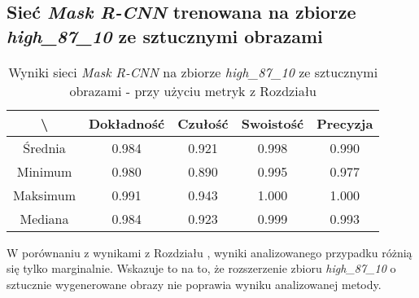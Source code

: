 \subsection{Sieć \textit{Mask R-CNN} trenowana na zbiorze \textit{high\_87\_10} ze sztucznymi obrazami}
\label{sec:results_high_original_generated}

\begin{table}[H]
	\centering
	\caption{Wyniki sieci \textit{Mask R-CNN} na zbiorze \textit{high\_87\_10} ze sztucznymi obrazami - przy użyciu metryk z Rozdziału }
	\vspace{6pt}
	{\footnotesize
		\begin{tabular}{|c|c|c|c|c|}
      \hline \textbackslash & Dokładność & Czułość & Swoistość & Precyzja \\
      \hline Średnia & 0.984 & 0.921 & 0.998 & 0.990 \\
      \hline Minimum & 0.980 & 0.890 & 0.995 & 0.977 \\
      \hline Maksimum & 0.991 & 0.943 & 1.000 & 1.000 \\
      \hline Mediana & 0.984 & 0.923 & 0.999 & 0.993 \\
      \hline
		\end{tabular}
	}
  \vspace{0pt}
  \label{Tab:high_original_generated_calculated}
\end{table}

W porównaniu z wynikami z Rozdziału , wyniki analizowanego przypadku różnią się tylko marginalnie. Wskazuje to na to, że rozszerzenie zbioru \textit{high\_87\_10} o sztucznie wygenerowane obrazy nie poprawia wyniku analizowanej metody.
